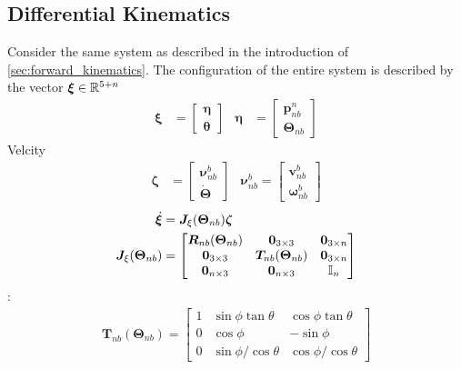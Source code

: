 \subsection{Differential Kinematics}
Consider the same system as described in the introduction of \autoref{sec:forward_kinematics}.
The configuration of the entire system is described by the vector $\bm{\xi} \in \mathbb{R}^{5+n}$
\begin{align}
    \bm{\xi} &= \begin{bmatrix}\bm{\eta} \\ \bm{\theta} \end{bmatrix} &
        \bm{\eta} &= \begin{bmatrix}\bm{p}_{nb}^n \\ \bm{\Theta}_{nb} \end{bmatrix}
\end{align}
Velcity
\begin{align}
    \bm{\zeta} &= \begin{bmatrix}\bm{\nu}_{nb}^b \\ \dot{\bm{\Theta}}\end{bmatrix} &
        \bm{\nu}_{nb}^b = \begin{bmatrix} \bm{v}_{nb}^b \\ \bm{\omega}_{nb}^b\end{bmatrix}
\end{align}
\begin{subequations}
\begin{align}
    \dot{\bm{\xi}} &= \bm{J}_{\xi}(\bm{\Theta}_{nb})\bm{\zeta} \\
    \bm{J}_{\xi}(\bm{\Theta}_{nb}) &= \begin{bmatrix}
        \bm{R}_{nb}(\bm{\Theta}_{nb}) & \bm{0}_{3 \times 3} & \bm{0}_{3 \times n} \\
        \bm{0}_{3 \times 3} & \bm{T}_{nb}(\bm{\Theta}_{nb}) & \bm{0}_{3 \times n} \\
        \bm{0}_{n \times 3} & \bm{0}_{n \times 3} & \mathbb{I}_{n}
    \end{bmatrix}
\end{align}
\end{subequations}
\cite{fossen2021}:
\begin{align}
    \bm{T}_{nb}(\bm{\Theta}_{nb}) = \begin{bmatrix}
        1 & \sin\phi \tan\theta & \cos \phi \tan \theta \\
        0 & \cos \phi & -\sin\phi \\
        0 & \sin \phi / \cos \theta & \cos \phi / \cos \theta
    \end{bmatrix}
\end{align}

